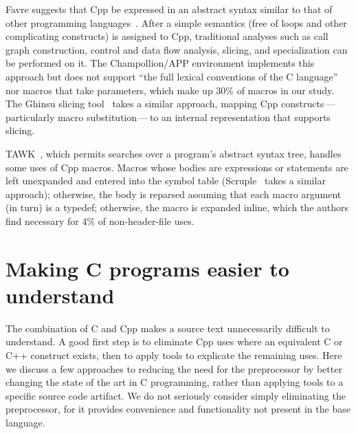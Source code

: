\documentclass[10pt]{article}
\newcommand{\comment}[1]{\textbf{[[#1]]}}
\def\nummacrodefs{26182}        %
\begin{document}

Favre suggests that Cpp be expressed in an abstract syntax similar to that
of other programming languages~\cite{Favre96}.  After a simple semantics
(free of loops and other complicating constructs) is assigned to Cpp,
traditional analyses such as call graph construction, control and data flow
analysis, slicing, and specialization can be performed on it.  The
Champollion/APP environment implements this approach but does not support
``the full lexical conventions of the C language'' nor macros that take
parameters, which make up 30\% of macros in our study.  The Ghinsu slicing
tool~\cite{LivadasS94} takes a similar approach, mapping Cpp
constructs\,---\,particularly macro substitution\,---\,to an internal
representation that supports slicing.

TAWK~\cite{GriswoldAM96}, which permits searches over a program's abstract
syntax tree, handles some uses of Cpp macros.  Macros whose bodies are
expressions or statements are left unexpanded and entered into the symbol
table (Scruple~\cite{PaulP94} takes a similar approach); otherwise, the
body is reparsed assuming that each macro argument (in turn) is a typedef;
otherwise, the macro is expanded inline, which the authors find necessary
for 4\% of non-header-file uses.





\section{Making C programs easier to understand}
\label{sec:easier-to-understand}

The combination of C and Cpp makes a source text unnecessarily difficult
to understand.  A good first step is to eliminate Cpp uses where an
equivalent C or C++ construct exists, then to apply tools to explicate
the remaining uses.  Here we discuss a few approaches to reducing the
need for the preprocessor by better changing the state of the art in C
programming, rather than applying tools to a specific source code
artifact.  We do not seriously consider simply eliminating the
preprocessor, for it provides convenience and functionality not present
in the base language.

\end{document}

